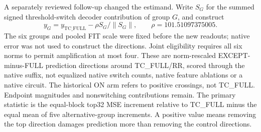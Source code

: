 A separately reviewed follow-up changed the estimand. Write $S_G$ for the summed signed threshold-switch decoder contribution of group $G$, and construct
\[
 y_G=y_{\mathrm{TC\_FULL}}-\rho S_G/\|S_G\|,\qquad \rho=101.51097375005.
\]
The six groups and pooled FIT scale were fixed before the new readouts; native error was not used to construct the directions. Joint eligibility requires all six norms to permit amplification at most four. These are norm-rescaled EXCEPT-minus-FULL prediction directions around TC\_FULL/RR, scored through the native suffix, not equalized native switch counts, native feature ablations or a native circuit. The historical ON arm refers to positive crossings, not TC\_FULL. Endpoint magnitudes and nonswitching contributions remain. The primary statistic is the equal-block top32 MSE increment relative to TC\_FULL minus the equal mean of five alternative-group increments. A positive value means removing the top direction damages prediction more than removing the control directions.

